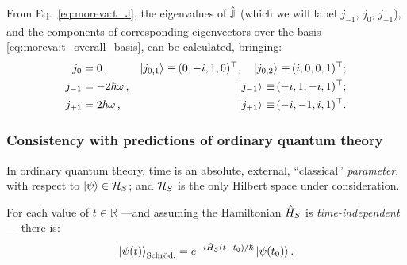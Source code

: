 From Eq.~\eqref{eq:moreva:t_J},
the eigenvalues of $\hat{\mathbb{J}}$
(which we will label $j_{-1}$, $j_{0}$, $j_{+1}$),
and the components of corresponding eigenvectors over the basis \eqref{eq:moreva:t_overall_basis},
can be calculated, bringing:
\begin{align}
  j_0     &= 0\,\text{,}              &\ket{j_{0,1}}  \operatorname*{\,\equiv\,} (0, -i, 1, 0)^\top \text{,}\quad \ket{j_{0,2}} \operatorname*{\,\equiv\,} (i, 0, 0 ,1)^\top \text{;}
    \label{eq:moreva:eigenJ0} \\
  j_{-1}  &= -2\hbar\omega\,\text{,}  &\ket{j_{-1}}   \operatorname*{\,\equiv\,} (-i, 1, -i, 1)^\top \text{;} \\
  j_{+1}   &= 2\hbar\omega\,\text{,}  &\ket{j_{+1}}   \operatorname*{\,\equiv\,} (-i, -1, i, 1)^\top \text{.}
\end{align}



\subsubsection{Consistency with predictions of ordinary quantum theory}
\label{sec:qubit:pw-vs-qm}

In ordinary quantum theory, time is an absolute, external, ``classical'' \emph{parameter},
with respect to $\ket{\psi} \in \mathcal{H}_S$; and $\mathcal{H}_S$
is the only Hilbert space under consideration.

For each value of $t \in \mathbb{R}$
---and assuming the Hamiltonian $\hat{H}_{S}$ is \emph{time-in\-de\-pend\-ent}---
there is:
\begin{equation}\label{eq:ordinary_evolution}
  \ket{\psi(t)}_{\text{Schr\"od.}} =
  e^{-i\hat{H}_{S}(t-t_0)/\hbar}\ket{\psi(t_0)}
  \text{.}
\end{equation}

